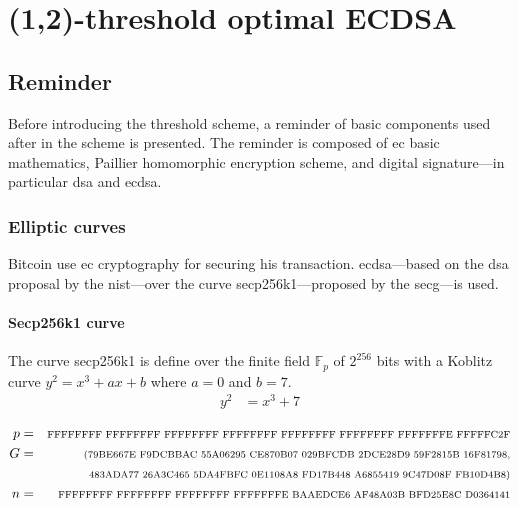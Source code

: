 \chapter{(1,2)-threshold optimal ECDSA}
\label{chap:threshold}


\minitoc

\newpage

\section{Reminder}

Before introducing the threshold scheme, a reminder of basic components used after in
the scheme is presented. The reminder is composed of \gls{ec} basic mathematics,
Paillier homomorphic encryption scheme, and digital signature---in particular
\gls{dsa} and \gls{ecdsa}.

\subsection{Elliptic curves}

Bitcoin use \gls{ec} cryptography for securing his transaction.
\gls{ecdsa}---based on the \gls{dsa} proposal by the \gls{nist}---over
the curve secp256k1---proposed by the \gls{secg}---is used. %

\subsubsection{Secp256k1 curve}
The curve secp256k1 is define over the finite field $\mathbb{F}_p$ of $2^{256}$ bits
with a Koblitz curve $y^2 = x^3 + ax + b$ where $a = 0$ and $b = 7$.
\begin{equation*}
\begin{split}
  y^2 &= x^3 + 7\\
\end{split}
\end{equation*}
\begin{equation*}
\begin{split}
  p &= &\text{\scriptsize FFFFFFFF FFFFFFFF FFFFFFFF FFFFFFFF FFFFFFFF FFFFFFFF FFFFFFFE FFFFFC2F}\\
  G &= &\text{\scriptsize (79BE667E F9DCBBAC 55A06295 CE870B07 029BFCDB 2DCE28D9 59F2815B 16F81798,}\\
    &  &\text{\scriptsize  483ADA77 26A3C465 5DA4FBFC 0E1108A8 FD17B448 A6855419 9C47D08F FB10D4B8)}\\
  n &= &\text{\scriptsize FFFFFFFF FFFFFFFF FFFFFFFF FFFFFFFE BAAEDCE6 AF48A03B BFD25E8C D0364141}
\end{split}
\end{equation*}

